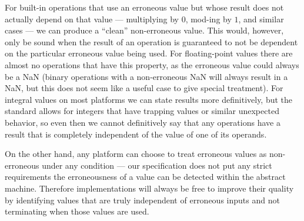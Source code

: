For built-in operations that use an erroneous value but whose result does not actually depend on that value --- multiplying by $0$, mod-ing by $1$, and similar cases --- we can produce a ``clean'' non-erroneous value.  This would, however, only be sound when the result of an operation is guaranteed to not be dependent on the particular erroneous value being used.  For floating-point values there are almost no operations that have this property, as the erroneous value could always be a NaN (binary operations with a non-erroneous NaN will always result in a NaN, but this does not seem like a useful case to give special treatment).   For integral values on most platforms we can state results more definitively, but the standard allows for integers that have trapping values or similar unexpected behavior, so even then we cannot definitively say that any operations have a result that is completely independent of the value of one of its operands.

On the other hand, any platform can choose to treat erroneous values as non-erroneous under any condition --- our specification does not put any strict requirements the  erroneousness of a value can be detected within the abstract machine.   Therefore implementations will always be free to improve their quality by identifying values that are truly independent of erroneous inputs and not terminating when those values are used.

